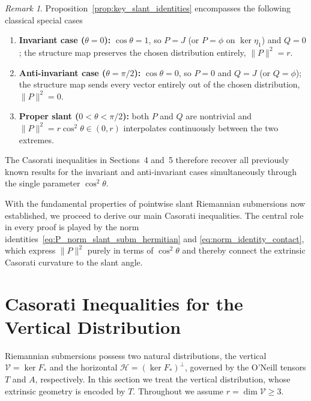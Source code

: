 \documentclass[11pt]{amsart}
\theoremstyle{plain}
\theoremstyle{definition}
\theoremstyle{remark}
\newtheorem{remark}[proposition]{Remark}
\newcommand{\calH}{\mathcal{H}}
\newcommand{\calV}{\mathcal{V}}
\begin{document}
\begin{remark}\label{rem:special_cases}
Proposition~\ref{prop:key_slant_identities} encompasses the
following classical special cases
\cite{Chen1990,Sahin2010a,LeeSahin2014}
\begin{enumerate}[label={(\alph*)}]
  \item \textbf{Invariant case ($\theta=0$):}\;
        $\cos\theta=1$, so $P=J$ (or $P=\phi$ on $\ker\eta_1$)
        and $Q=0$; the structure map preserves the chosen
        distribution entirely, $\|P\|^2=r$.
  \item \textbf{Anti-invariant case ($\theta=\pi/2$):}\;
        $\cos\theta=0$, so $P=0$ and $Q=J$ (or $Q=\phi$); the
        structure map sends every vector entirely out of the
        chosen distribution, $\|P\|^2=0$.
  \item \textbf{Proper slant ($0<\theta<\pi/2$):}\; both $P$
        and $Q$ are nontrivial and
        $\|P\|^2=r\cos^2\theta\in(0,r)$ interpolates
        continuously between the two extremes.
\end{enumerate}
The Casorati inequalities in Sections~4 and~5 therefore recover
all previously known results for the invariant and
anti-invariant cases simultaneously through the single
parameter $\cos^2\theta$.
\end{remark}

With the fundamental properties of pointwise slant Riemannian submersions now
established, we proceed to derive our main Casorati inequalities. The central
role in every proof is played by the norm
identities~\eqref{eq:P_norm_slant_subm_hermitian} and
\eqref{eq:norm_identity_contact}, which express $\|P\|^2$ purely in terms of
$\cos^2\theta$ and thereby connect the extrinsic Casorati curvature to the slant
angle.


\section{Casorati Inequalities for the Vertical Distribution}\label{sec:vertical}

Riemannian submersions possess two natural distributions, the vertical
$\calV=\ker F_*$ and the horizontal $\calH=(\ker F_*)^{\perp}$, governed by the
O'Neill tensors $T$ and $A$, respectively. In this section we treat the vertical
distribution, whose extrinsic geometry is encoded by $T$. Throughout we assume
$r=\dim\calV\geq 3$.
\end{document}
